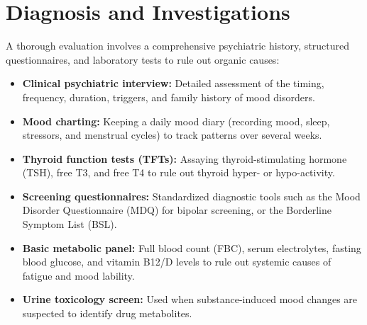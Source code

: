 \section*{Diagnosis and Investigations}
A thorough evaluation involves a comprehensive psychiatric history, structured questionnaires, and laboratory tests to rule out organic causes:
\begin{itemize}
    \item \textbf{Clinical psychiatric interview:} Detailed assessment of the timing, frequency, duration, triggers, and family history of mood disorders.
    \item \textbf{Mood charting:} Keeping a daily mood diary (recording mood, sleep, stressors, and menstrual cycles) to track patterns over several weeks.
    \item \textbf{Thyroid function tests (TFTs):} Assaying thyroid-stimulating hormone (TSH), free T3, and free T4 to rule out thyroid hyper- or hypo-activity.
    \item \textbf{Screening questionnaires:} Standardized diagnostic tools such as the Mood Disorder Questionnaire (MDQ) for bipolar screening, or the Borderline Symptom List (BSL).
    \item \textbf{Basic metabolic panel:} Full blood count (FBC), serum electrolytes, fasting blood glucose, and vitamin B12/D levels to rule out systemic causes of fatigue and mood lability.
    \item \textbf{Urine toxicology screen:} Used when substance-induced mood changes are suspected to identify drug metabolites.
\end{itemize}

